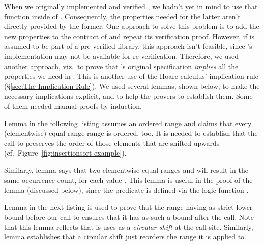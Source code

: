 

When we originally 
implemented and verified \rotatei, we hadn't yet in mind to
use that function inside of \insertionsort.
%
Consequently, the properties needed for the latter
aren't directly provided by the former.
%
One approach to solve this problem is to add the new properties to
the contract of  and repeat its verification proof.
However, if \rotatei is assumed to be part of a pre-verified library,
this approach isn't feasible, since \rotatei's implementation may not
be available for re-verification.
%
Therefore, we used another approach, viz.\ to prove that \rotatei's
original specification \emph{implies} all the properties we need in
\insertionsort.
This is another use of the Hoare calculus' implication rule
(\S\ref{sec:The Implication Rule}).
%
We used several lemmas, shown below,
to make the necessary implications explicit, and to help the provers to
establish them.
%
Some of them needed manual proofs by induction.

\clearpage

Lemma  in the following listing assumes an ordered range
 and claims that every (elementwise) equal range
range  is ordered, too.
%
It is needed to establish that the call to  preserves the order of
those elements that are shifted upwards 
(cf.\ Figure~\ref{fig:insertionsort-example}).

Similarly, lemma  says that two elementwise equal ranges
 and  will result in the same occurrence count,
for each value .
%
This lemma is useful in the proof of the lemma
 (discussed below),
since the predicate 
is defined via the logic function .

Lemma  in the next listing
is used to prove that the range  having 
 as strict lower bound before our call to \rotatei ensures
that it has  as such a bound after the call.
Note that this lemma reflects that \rotatei is uses as a \emph{circular shift}
at the call site.
%
Similarly, lemma \CircularShiftMultisetReorder establishes that 
a circular shift just reorders the range it is applied to.



\clearpage

